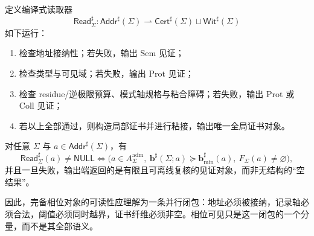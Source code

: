 \begin{definition}[编译式读取器]\label{def:unit-circle-complete-phase-compiled-reader}
定义编译式读取器
\[
\mathsf{Read}^{\sharp}_{\Sigma}:
\mathsf{Addr}^{\sharp}(\Sigma)\rightharpoonup
\mathsf{Cert}^{\sharp}(\Sigma)\sqcup\mathsf{Wit}^{\sharp}(\Sigma)
\]
如下运行：
\begin{enumerate}
  \item 检查地址接纳性；若失败，输出 \(\mathrm{Sem}\) 见证；
  \item 检查类型与可见域；若失败，输出 \(\mathrm{Prot}\) 见证；
  \item 检查 residue/逆极限预算、模式轴规格与粘合障碍；若失败，输出 \(\mathrm{Prot}\) 或 \(\mathrm{Coll}\) 见证；
  \item 若以上全部通过，则构造局部证书并进行粘接，输出唯一全局证书对象。
\end{enumerate}
\end{definition}

\begin{proposition}[编译式可读性判据]\label{prop:unit-circle-complete-phase-compiled-criterion}
对任意 \(\Sigma\) 与 \(a\in\mathsf{Addr}^{\sharp}(\Sigma)\)，有
\[
\mathsf{Read}^{\sharp}_{\Sigma}(a)\neq\mathsf{NULL}
\iff
\bigl(
a\in A^{\mathrm{adm}}_\Sigma,\ 
\mathbf b^\sharp(\Sigma;a)\succeq \mathbf b^\sharp_{\min}(a),\ 
F_\Sigma(a)\neq\varnothing
\bigr),
\]
并且一旦失败，输出端返回的是有限且可离线复核的见证对象，而非无结构的“空结果”。
\end{proposition}

因此，完备相位对象的可读性应理解为一条并行闭包：地址必须被接纳，记录轴必须合法，阈值必须同时越界，证书纤维必须非空。相位可见只是这一闭包的一个分量，而不是其全部语义。
